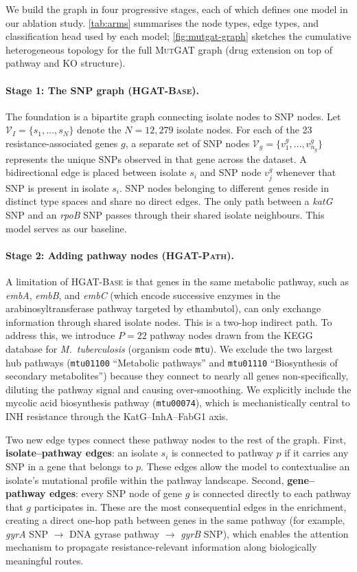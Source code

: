 \documentclass{article}
\theoremstyle{plain}
\theoremstyle{definition}
\theoremstyle{remark}
\begin{document}
We build the graph in four progressive stages, each of which defines one model in our ablation study. \cref{tab:arms} summarises the node types, edge types, and classification head used by each model; \cref{fig:mutgat-graph} sketches the cumulative heterogeneous topology for the full \textsc{MutGAT} graph (drug extension on top of pathway and KO structure).

\paragraph{Stage 1: The SNP graph (\textsc{HGAT-Base}).}
The foundation is a bipartite graph connecting isolate nodes to SNP nodes. Let $\mathcal{V}_I = \{s_1, \ldots, s_N\}$ denote the $N = 12{,}279$ isolate nodes. For each of the 23 resistance-associated genes $g$, a separate set of SNP nodes $\mathcal{V}_g = \{v^g_1, \ldots, v^g_{n_g}\}$ represents the unique SNPs observed in that gene across the dataset. A bidirectional edge is placed between isolate $s_i$ and SNP node $v^g_j$ whenever that SNP is present in isolate $s_i$. SNP nodes belonging to different genes reside in distinct type spaces and share no direct edges. The only path between a \textit{katG} SNP and an \textit{rpoB} SNP passes through their shared isolate neighbours. This model serves as our baseline.

\paragraph{Stage 2: Adding pathway nodes (\textsc{HGAT-Path}).}
A limitation of \textsc{HGAT-Base} is that genes in the same metabolic pathway, such as \textit{embA}, \textit{embB}, and \textit{embC} (which encode successive enzymes in the arabinosyltransferase pathway targeted by ethambutol), can only exchange information through shared isolate nodes. This is a two-hop indirect path. To address this, we introduce $P = 22$ pathway nodes drawn from the KEGG database for \textit{M.~tuberculosis} (organism code \texttt{mtu}). We exclude the two largest hub pathways (\texttt{mtu01100} ``Metabolic pathways'' and \texttt{mtu01110} ``Biosynthesis of secondary metabolites'') because they connect to nearly all genes non-specifically, diluting the pathway signal and causing over-smoothing. We explicitly include the mycolic acid biosynthesis pathway (\texttt{mtu00074}), which is mechanistically central to INH resistance through the KatG--InhA--FabG1 axis.

Two new edge types connect these pathway nodes to the rest of the graph. First, \textbf{isolate--pathway edges}: an isolate $s_i$ is connected to pathway $p$ if it carries any SNP in a gene that belongs to $p$. These edges allow the model to contextualise an isolate's mutational profile within the pathway landscape. Second, \textbf{gene--pathway edges}: every SNP node of gene $g$ is connected directly to each pathway that $g$ participates in. These are the most consequential edges in the enrichment, creating a direct one-hop path between genes in the same pathway (for example, \textit{gyrA} SNP $\to$ DNA gyrase pathway $\to$ \textit{gyrB} SNP), which enables the attention mechanism to propagate resistance-relevant information along biologically meaningful routes.
\end{document}
